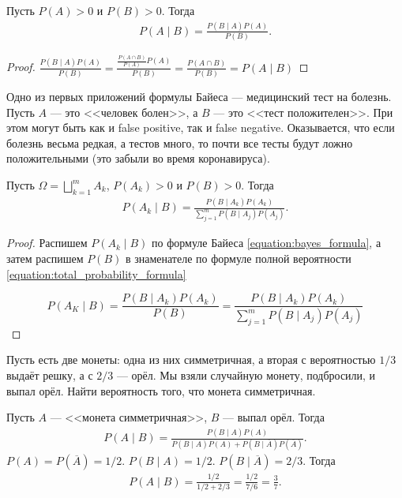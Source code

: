 \begin{prop}
 Пусть $P(A) > 0$ и  $P(B) > 0$. Тогда
 \begin{align}
  \label{equation:bayes_formula}
  P(A \mid B) = \frac{P(B \mid A)P(A)}{P(B)}.
 \end{align} 
\end{prop}
\begin{proof} $\frac{P(B \mid A)P(A)}{P(B)} = \frac{\frac{P(A \cap B)}{P(A)}P(A)}{P(B)} = \frac{P(A \cap B)}{P(B)} = P(A \mid B)$
\end{proof}
\begin{exmpl*}
 Одно из первых приложений формулы Байеса --- медицинский тест на болезнь. Пусть $A$ --- это <<человек болен>>, а $B$ --- это <<тест положителен>>. При этом могут быть как и false positive, так и false negative. Оказывается, что если болезнь весьма редкая, а тестов много, то почти все тесты будут ложно положительными (это забыли во время коронавируса).
\end{exmpl*}

\begin{thm}[Байеса]
 Пусть $\Omega = \bigsqcup_{k=1}^{m} A_k$, $P(A_k) > 0$ и $P(B) > 0$. Тогда
 \begin{align*}
  P(A_k \mid B) = \frac{P(B \mid A_k)P(A_k)}{\sum_{j=1}^{m} P(B \mid A_j)P(A_j)}
 .\end{align*} 
\end{thm}

\begin{proof}
	Распишем $P(A_k \mid B)$ по формуле Байеса \eqref{equation:bayes_formula}, а затем распишем $P(B)$ в знаменателе по формуле полной вероятности \eqref{equation:total_probability_formula}

	\[
		P(A_K \mid B) = \frac{P(B \mid A_k)P(A_k)}{P(B)} = \frac{P(B \mid A_k)P(A_k)}{\sum_{j = 1}^m P(B \mid A_j)P(A_j)}
	\]  

\end{proof}

\begin{exmpl*}
 Пусть есть две монеты: одна из них симметричная, а вторая с вероятностью $1 / 3$ выдаёт решку, а с $2 / 3$ --- орёл. Мы взяли случайную монету, подбросили, и выпал орёл. Найти вероятность того, что монета симметричная.

 Пусть $A$ --- <<монета симметричная>>, $B$ --- выпал орёл. Тогда
 \begin{align*}
  P(A \mid B) = \frac{P(B\mid A)P(A)}{P(B \mid A)P(A) + P(B \mid \overline A) P(\overline A)}
 .\end{align*} $P(A) = P(\overline A) = 1 / 2$.  $P(B \mid A) = 1 / 2$.  $P(B \mid \overline A) = 2 / 3$. Тогда
 \begin{align*}
  P(A \mid B) = \frac{1 / 2}{1 / 2 + 2 / 3} = \frac{1 / 2}{7 / 6} = \frac{3}{7}
 .\end{align*} 

\end{exmpl*}

